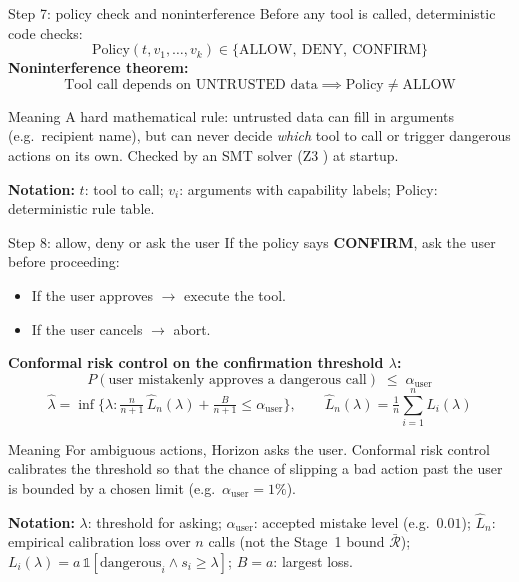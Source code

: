 \documentclass[aspectratio=169,11pt]{beamer}
\providecommand{\notation}[1]{\par\vfill{\scriptsize\textcolor{gray!80!black}{\textbf{Notation:} #1}}}
\begin{document}
\begin{frame}{Step 7: policy check and noninterference \cite{goguen1982}}
  Before any tool is called, deterministic code checks:
  \[
    \mathrm{Policy}(t, v_1, \dots, v_k) \in \{\text{ALLOW},\ \text{DENY},\ \text{CONFIRM}\}
  \]
  \small
  \textbf{Noninterference theorem:}
  \[
    \text{Tool call depends on UNTRUSTED data} \implies \mathrm{Policy} \neq \text{ALLOW}
  \]
  \begin{block}{Meaning}
    A hard mathematical rule: untrusted data can fill in arguments (e.g.\ recipient name), but can never decide \emph{which} tool to call or trigger dangerous actions on its own. Checked by an SMT solver (Z3 \cite{demoura2008z3}) at startup.
  \end{block}
  \notation{$t$: tool to call; $v_i$: arguments with capability labels; $\mathrm{Policy}$: deterministic rule table.}
\end{frame}

\begin{frame}{Step 8: allow, deny or ask the user \cite{angelopoulos2024crc}}
  If the policy says \textbf{CONFIRM}, ask the user before proceeding:
  \small
  \begin{itemize}
    \item If the user approves $\to$ execute the tool.
    \item If the user cancels $\to$ abort.
  \end{itemize}
  \textbf{Conformal risk control on the confirmation threshold $\lambda$:}
  \[
    \boxed{\;
    P(\text{user mistakenly approves a dangerous call}) \;\le\; \alpha_{\mathrm{user}} \;}
  \]
  \[
    \hat{\lambda} = \inf\Big\{\lambda : \tfrac{n}{n+1}\,\hat{L}_n(\lambda) + \tfrac{B}{n+1} \le \alpha_{\mathrm{user}}\Big\},
    \qquad \hat{L}_n(\lambda) = \tfrac{1}{n}\textstyle\sum_{i=1}^{n} L_i(\lambda)
  \]
  \begin{block}{Meaning}
    For ambiguous actions, Horizon asks the user. Conformal risk control calibrates the threshold so that the chance of slipping a bad action past the user is bounded by a chosen limit (e.g.\ $\alpha_{\mathrm{user}} = 1\%$).
  \end{block}
  \notation{$\lambda$: threshold for asking; $\alpha_{\mathrm{user}}$: accepted mistake level (e.g.\ $0.01$); $\hat{L}_n$: empirical calibration loss over $n$ calls (not the Stage~1 bound $\bar{\mathcal{R}}$); $L_i(\lambda) = a\,\mathbb{1}[\text{dangerous}_i \wedge s_i \ge \lambda]$; $B = a$: largest loss.}
\end{frame}
\end{document}
